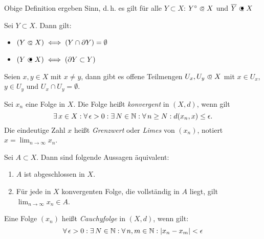 \documentclass{cheat-sheet}
\begin{document}
\begin{satz}
Obige Definition ergeben Sinn, d.\,h. es gilt für alle $Y \subset X$: $Y^{\circ} \opn X$ und $\overline{Y} \cls X$
\end{satz}


\begin{satz}
Sei $Y \subset X$. Dann gilt:
\begin{multicols}{2}
  \begin{itemize}
    \item $(Y \opn X) \iff (Y \cap \partial Y) = \emptyset$
    \item $(Y \cls X) \iff (\partial Y \subset Y)$
  \end{itemize}
\end{multicols}
\end{satz}

\begin{satz}
Seien $x, y \in X$ mit $x \not= y$, dann gibt es offene Teilmengen $U_x, U_y \opn X$ mit $x \in U_x$, $y \in U_y$ und $U_x \cap U_y = \emptyset$.
\end{satz}

\begin{defn}
Sei $x_n$ eine Folge in $X$. Die Folge heißt \emph{konvergent} in $(X, d)$, wenn gilt
\[ \exists\,x \in X : \forall\,\epsilon > 0 : \exists\,N \in \mathbb{N} : \forall\,n \ge N : d(x_n, x) \le \epsilon. \]
Die eindeutige Zahl $x$ heißt \emph{Grenzwert} oder \emph{Limes} von $(x_n)$, notiert $x = \lim_{n \to \infty} x_n$.
\end{defn}

\begin{satz}
Sei $A \subset X$. Dann sind folgende Aussagen äquivalent:
\begin{enumerate}
  \item $A$ ist abgeschlossen in $X$.
  \item Für jede in $X$ konvergenten Folge, die vollständig in $A$ liegt, gilt $\lim_{n \to \infty} x_n \in A$.
\end{enumerate}
\end{satz}

\begin{defn}
Eine Folge $(x_n)$ heißt \emph{Cauchyfolge} in $(X, d)$, wenn gilt:
\[ \forall\,\epsilon > 0 : \exists\,N \in \mathbb{N} : \forall\,n, m \in \mathbb{N} : |x_n - x_m| < \epsilon \]
\end{defn}
\end{document}
